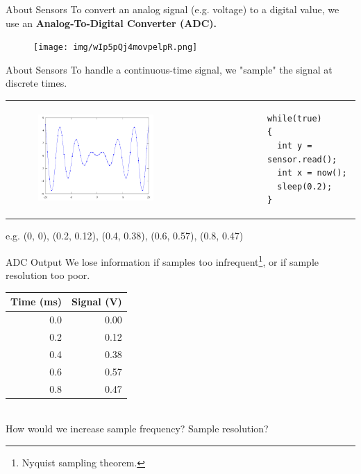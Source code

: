\documentclass{beamer}
\begin{document}
\begin{frame}[fragile]{About Sensors}
\small{To convert an analog signal (e.g. voltage) to a digital value, we use an {\bf Analog-To-Digital Converter (ADC).}}	\\
\vspace{0.5em}
\begin{figure}[b]
\centering
\texttt{[image: img/wIp5pQj4movpelpR.png]}
\end{figure}
\end{frame}	
	
\begin{frame}[fragile]{About Sensors}
\small To handle a continuous-time signal, we "sample" the signal at discrete times.	\\
\vspace{0.5em}
\begin{tabular}{@{}m{} m{}@{}}
\begin{figure}
\centering
\includegraphics[width=0.6\textwidth,height=0.6\textheight,keepaspectratio]{img/sine-points.png}
\end{figure}
&
\begin{Verbatim}[fontsize=\scriptsize]
while(true)
{
  int y = sensor.read();
  int x = now();
  sleep(0.2);
}		
\end{Verbatim}	
\end{tabular}
\vspace{0.5em}
e.g. (0, 0), (0.2, 0.12), (0.4, 0.38), (0.6, 0.57), (0.8, 0.47)	\\	
\end{frame}
  
\begin{frame}{ADC Output}
We lose information if samples too infrequent\footnote{Nyquist sampling theorem.}, or if sample resolution too poor.
\begin{center}
\begin{tabular}{r|r}
Time (ms) & Signal (V) \\ \hline
0.0 & 0.00 \\
0.2 & 0.12 \\
0.4 & 0.38 \\
0.6 & 0.57 \\
0.8 & 0.47 \\
\end{tabular}
\end{center}
~\\[1em]
How would we increase sample frequency? Sample resolution?
\end{frame}  
 
\end{document}
